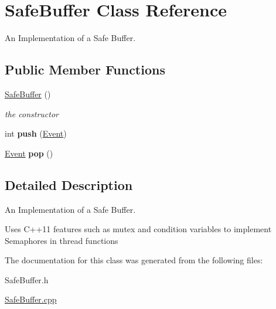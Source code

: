 \hypertarget{class_safe_buffer}{}\section{Safe\+Buffer Class Reference}
\label{class_safe_buffer}


An Implementation of a Safe Buffer.  


\subsection*{Public Member Functions}
\begin{DoxyCompactItemize}
\item 
\mbox{\label{class_safe_buffer_af835d8d08c4dcd3326f21ae2e9988699}} 
\hyperlink{class_safe_buffer_af835d8d08c4dcd3326f21ae2e9988699}{Safe\+Buffer} ()
\begin{DoxyCompactList}\small\item\em the constructor \end{DoxyCompactList}\item 
\mbox{\label{class_safe_buffer_ac3ed0799ec2e84c97e36b22c83f7abf5}} 
int {\bfseries push} (\hyperlink{class_event}{Event})
\item 
\mbox{\label{class_safe_buffer_a90a33fca4d838f7c0eef6e8557f3c281}} 
\hyperlink{class_event}{Event} {\bfseries pop} ()
\end{DoxyCompactItemize}


\subsection{Detailed Description}
An Implementation of a Safe Buffer. 

Uses C++11 features such as mutex and condition variables to implement Semaphores in thread functions 

The documentation for this class was generated from the following files\+:\begin{DoxyCompactItemize}
\item 
Safe\+Buffer.\+h\item 
\hyperlink{_safe_buffer_8cpp}{Safe\+Buffer.\+cpp}\end{DoxyCompactItemize}
